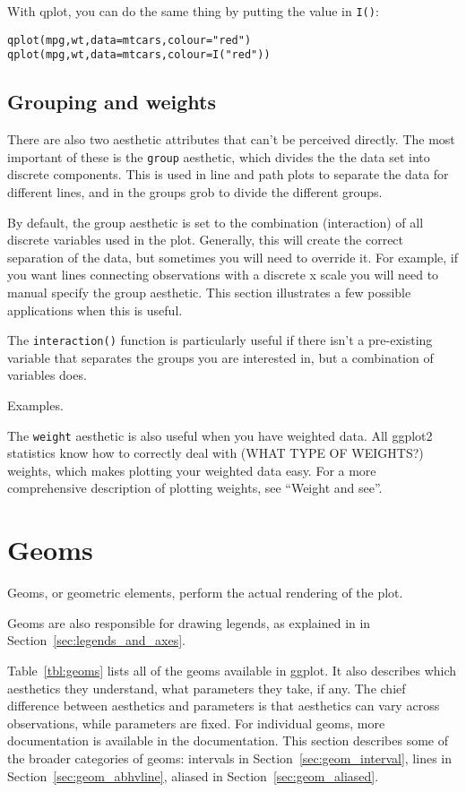 With qplot, you can do the same thing by putting the value in {\tt I()}:

\begin{alltt}
  qplot(mpg, wt, data=mtcars, colour = "red")
  qplot(mpg, wt, data=mtcars, colour = I("red"))
\end{alltt}


\subsection{Grouping and weights}
\label{sub:grouping}

There are also two aesthetic attributes that can't be perceived directly.  The most important of these is the {\tt group} aesthetic, which divides the the data set into discrete components.   This is used in line and path plots to separate the data for different lines, and in the groups grob to divide the different groups. 

By default, the group aesthetic is set to the combination (interaction) of all discrete variables used in the plot.  Generally, this will create the correct separation of the data, but sometimes you will need to override it.  For example, if you want lines connecting observations with a discrete x scale you will need to manual specify the group aesthetic.  This section illustrates a few possible applications when this is useful.

The {\tt interaction()} function is particularly useful if there isn't a pre-existing variable that separates the groups you are interested in, but a combination of variables does.  

Examples.

The {\tt weight} aesthetic is also useful when you have weighted data.  All ggplot2 statistics know how to correctly deal with (WHAT TYPE OF WEIGHTS?) weights, which makes plotting your weighted data easy.  For a more comprehensive description of plotting weights, see ``Weight and see''.



\section{Geoms}
\label{sec:geom}


Geoms, or geometric elements, perform the actual rendering of the plot.

Geoms are also responsible for drawing legends, as explained in in Section~\ref{sec:legends_and_axes}.

Table~\ref{tbl:geoms} lists all of the geoms available in ggplot.  It also describes which aesthetics they understand, what parameters they take, if any.  The chief difference between aesthetics and parameters is that aesthetics can vary across observations, while parameters are fixed.  For individual geoms, more documentation is available in the documentation.  This section describes some of the broader categories of geoms: intervals in Section~\ref{sec:geom_interval}, lines in Section~\ref{sec:geom_abhvline}, aliased in Section~\ref{sec:geom_aliased}.

